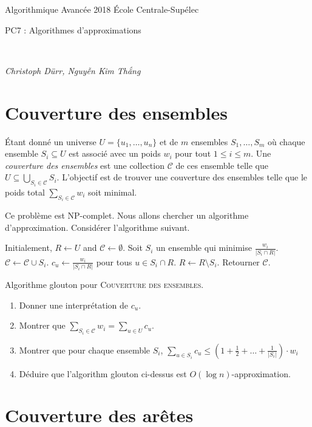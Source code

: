\documentclass[12pt]{article}
\newcommand{\MakeScribeTop}[1]{
\noindent
\begin{framed}
\noindent
 Algorithmique Avancée 2018
 \hfill
 École Centrale-Supélec
 \\[1em]
 \centerline{ \Large
#1
 }
 \\[1em]
\centerline{  \it Christoph Dürr, Nguyễn Kim Thắng}
\end{framed}
}
\begin{document}
    \MakeScribeTop{PC7 : Algorithmes d'approximations}



\section{Couverture des ensembles}

Étant donné un universe $U = \{u_{1}, \ldots, u_{n}\}$ et de $m$ ensembles 
$S_{1}, \ldots, S_{m}$ où chaque ensemble $S_{i} \subseteq U$ est associé avec un poids $w_{i}$ pour tout $1 \leq i \leq m$.
Une \emph{couverture des ensembles} est une collection $\mathcal{C}$ de
ces ensemble telle que $U \subseteq \bigcup_{S_{i} \in \mathcal{C}} S_{i}$. 
L'objectif est de trouver une couverture des ensembles telle que le poids total 
$\sum_{S_{i} \in \mathcal{C}} w_{i}$ soit minimal.
%

Ce problème est NP-complet. Nous allons chercher un algorithme d'approximation.
Considérer l'algorithme suivant.

\begin{algorithm}[ht]
\begin{algorithmic}[1]  
\STATE Initialement, $R \gets U$ and $\mathcal{C} \gets \emptyset$. 
	\STATE Soit $S_{i}$ un ensemble qui minimise $\frac{w_{i}}{|S_{i} \cap R|}$.
	\STATE $\mathcal{C} \gets \mathcal{C} \cup S_{i}$.
	\STATE $c_{u} \gets \frac{w_{i}}{|S_{i} \cap R|}$ pour tous $u \in S_{i} \cap R$. 
	\STATE $R \gets R \setminus S_{i}$.
\ENDWHILE
\STATE Retourner $\mathcal{C}$.
\end{algorithmic}
\caption{Algorithme glouton pour \textsc{Couverture des ensembles}.}
\label{algo:covering}
\end{algorithm}


\begin{enumerate}
	\item Donner une interprétation de $c_{u}$.
	\item Montrer que $\sum_{S_{i} \in \mathcal{C}} w_{i} = \sum_{u \in U} c_{u}$.
	\item Montrer que pour chaque ensemble $S_{i}$, 
		$
			\sum_{u \in S_{i}} c_{u} \leq \left( 1 + \frac{1}{2} + \ldots + \frac{1}{|S_{i}|} \right) \cdot w_{i}
		$
	\item Déduire que l'algorithm glouton ci-dessus est $O(\log n)$-approximation.
\end{enumerate}

\section{Couverture des arêtes}
\end{document}
